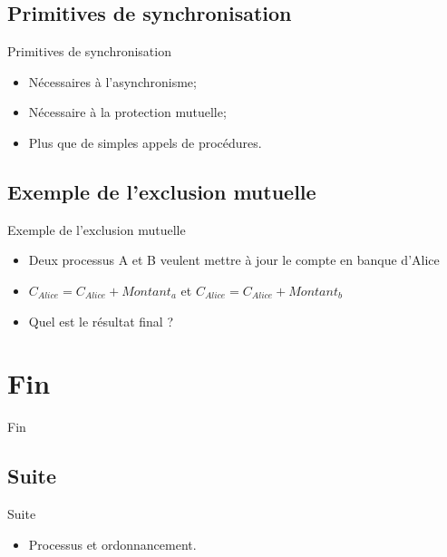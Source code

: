 \begin{frame}{\sectitle}
\def\subsectitle{Primitives de synchronisation}
\subsection{\subsectitle}

\begin{block}{\subsectitle}
\begin{itemize}
    \item Nécessaires à l'asynchronisme;
    \item Nécessaire à la protection mutuelle;
    \item Plus que de simples appels de procédures.
\end{itemize}
\end{block}

\def\subsectitle{Exemple de l'exclusion mutuelle}
\subsection{\subsectitle}

\begin{exampleblock}{\subsectitle}
\begin{itemize}
    \item Deux processus A et B veulent mettre à jour le compte en banque
    d'Alice
    \item $C_{Alice} = C_{Alice} + Montant_{a}$ et $C_{Alice} = C_{Alice} +
    Montant_{b}$
    \item Quel est le résultat final ?

\end{itemize}
\end{exampleblock}

\end{frame}

\def\sectitle{Fin}
\section{\sectitle}

\begin{frame}{\sectitle}
\def\subsectitle{Suite}
\subsection{\subsectitle}

\begin{exampleblock}{\subsectitle}
\begin{itemize}
    \item Processus et ordonnancement.
\end{itemize}
\end{exampleblock}

\end{frame}


